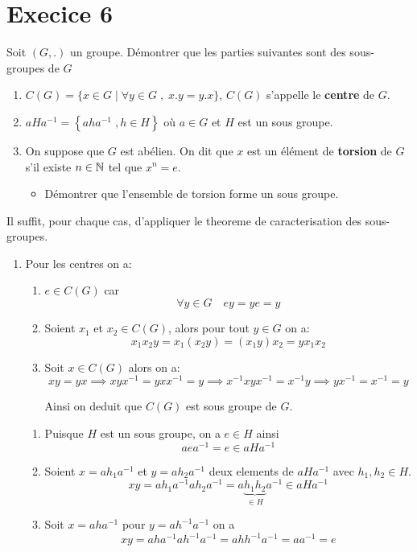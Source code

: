 \documentclass{report}
\begin{document}

\section{Execice 6}
{

Soit $\left(G,.\right)$ un groupe. Démontrer que les parties suivantes sont des
sous-groupes de $G$

\begin{enumerate}
  \item $C(G) = \{x\in G\;|\; \forall y \in G\;,\; x.y = y.x\} $, $C(G)$
    s'appelle le \textbf{centre}  de $G$.
  \item $aHa^{-1} = \left\{a h a^{-1}\;, h\in H\right\}$ où $a\in G$ et $H$ est
    un sous groupe.
  \item On suppose que $G$ est abélien. On dit que $x$ est un élément  de
    \textbf{torsion} de $G$ s'il existe $n\in \mathbb{N}$ tel que $x^n=e$.

    \begin{itemize}
      \item Démontrer que l'ensemble de torsion forme un sous groupe.
    \end{itemize}
\end{enumerate}
}
\begin{myproof}
  Il suffit, pour chaque cas, d'appliquer le theoreme de caracterisation des sous-groupes. 
  \begin{enumerate}
    \item Pour les centres on a:
      \begin{enumerate}
        \item $e \in C(G)$ car 
          $$
          \forall y \in G \quad ey = ye =y
          $$
        \item Soient $x_1$ et $x_2 \in C(G)$, alors pour tout $y \in G$ on a:
          $$
          x_1x_2y = x_1(x_2y) = (x_1y)x_2 = yx_1x_2
          $$
        \item Soit $x\in C(G)$ alors on a:
          $$
          xy = yx \implies xyx^{-1} = yxx^{-1} = y \implies x^{-1}xyx^{-1} = x^{-1}y  \implies yx^{-1} = x^{-1} =y 
          $$

          Ainsi on deduit que $C(G)$ est sous groupe de $G$.
      \end{enumerate}
      \begin{enumerate}
        \item  Puisque $H$ est un sous groupe, on a $e\in H$ ainsi 
          $$
          aea^{-1} = e \in aHa^{-1}
          $$
        \item Soient $x = ah_1a^{-1}$ et $y = a h_2 a^{-1}$ deux elements de $aHa^{-1}$ avec $h_1, h_2 \in H$.
          $$
          xy = ah_1a^{-1}ah_2 a^{-1} = a\underbrace{h_1h_2}_{\in H}a^{-1} \in aHa^{-1}
          $$
        \item Soit $x = aha^{-1}$ pour $y = ah^{-1}a^{-1}$ on a
          $$
          xy = aha^{-1}ah^{-1}a^{-1} = ahh^{-1}a^{-1} = aa^{-1} = e
          $$
      \end{enumerate}
  \end{enumerate}
\end{myproof}
\end{document}
